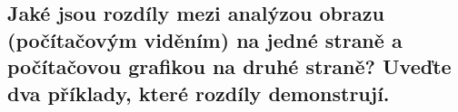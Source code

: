 \subsection{Jaké jsou rozdíly mezi analýzou obrazu (počítačovým viděním) na jedné straně a počítačovou grafikou na 
druhé straně? Uveďte dva příklady, které rozdíly demonstrují.}